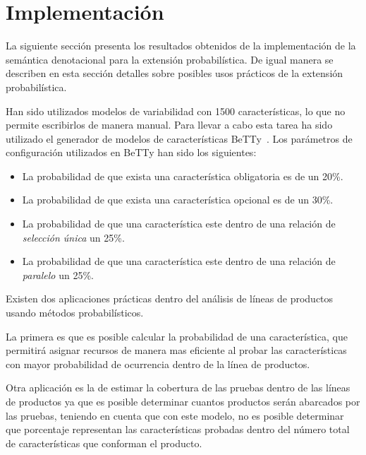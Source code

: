 
\section{Implementación}
\label{sec:stat:impl}

La siguiente sección presenta los resultados obtenidos
de la implementación de la semántica denotacional
para la extensión probabilística.
De igual manera se describen en esta sección detalles
sobre posibles usos prácticos de la extensión
probabilística.

Han sido utilizados modelos de variabilidad con 1500
características, lo que no permite escribirlos de manera manual.
Para llevar a cabo esta tarea ha sido utilizado el
generador de modelos de características BeTTy~\cite{SeguraHBC11}.
Los parámetros de configuración utilizados en BeTTy han
sido los siguientes: 

\begin{itemize}
	\item La probabilidad de que exista una característica obligatoria es de un 20\%.
	\item La probabilidad de que exista una característica opcional es de un 30\%.
	\item La probabilidad de que una característica este dentro de una relación de \emph{selección única} un 25\%.
	\item La probabilidad de que una característica este dentro de una relación de \emph{paralelo} un 25\%.
\end{itemize}


Existen dos aplicaciones prácticas dentro del
análisis de líneas de productos usando métodos probabilísticos.

La primera es que es posible calcular la probabilidad
de una característica, que permitirá asignar recursos
de manera mas eficiente al probar las
características con mayor probabilidad de ocurrencia
dentro de la línea de productos.

Otra aplicación es la de estimar la cobertura de las
pruebas dentro de las 
líneas de productos ya que es posible
determinar cuantos productos serán abarcados por las 
pruebas, teniendo en cuenta que con este modelo, no 
es posible determinar que porcentaje representan las
características probadas dentro del número total de
características que conforman el producto.

